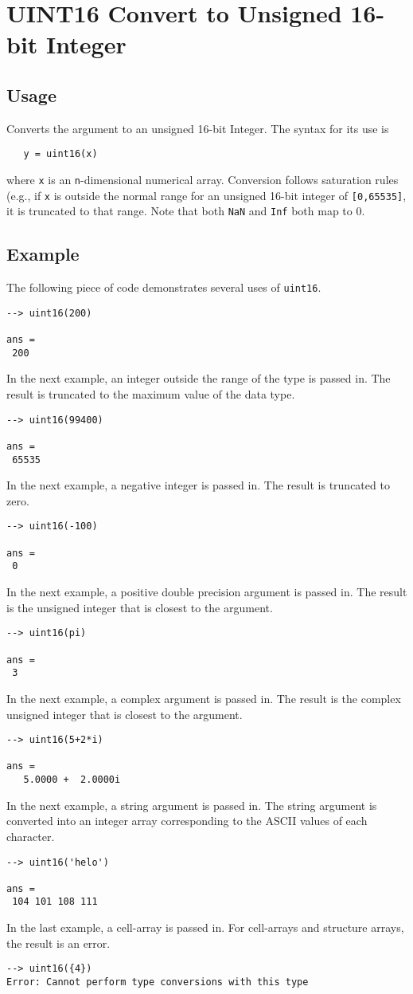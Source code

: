 \section{UINT16 Convert to Unsigned 16-bit Integer}

\subsection{Usage}

Converts the argument to an unsigned 16-bit Integer.  The syntax
for its use is
\begin{verbatim}
   y = uint16(x)
\end{verbatim}
where \verb|x| is an \verb|n|-dimensional numerical array.  Conversion
follows saturation rules (e.g., if \verb|x| is outside the normal
range for an unsigned 16-bit integer of \verb|[0,65535]|, it is truncated
to that range.  Note that
both \verb|NaN| and \verb|Inf| both map to 0.
\subsection{Example}

The following piece of code demonstrates several uses of \verb|uint16|.
\begin{verbatim}
--> uint16(200)

ans = 
 200 
\end{verbatim}
In the next example, an integer outside the range  of the type is passed in.  
The result is truncated to the maximum value of the data type.
\begin{verbatim}
--> uint16(99400)

ans = 
 65535 
\end{verbatim}
In the next example, a negative integer is passed in.  The result is 
truncated to zero.
\begin{verbatim}
--> uint16(-100)

ans = 
 0 
\end{verbatim}
In the next example, a positive double precision argument is passed in.  
The result is the unsigned integer that is closest to the argument.
\begin{verbatim}
--> uint16(pi)

ans = 
 3 
\end{verbatim}
In the next example, a complex argument is passed in.  The result is the 
complex unsigned integer that is closest to the argument.
\begin{verbatim}
--> uint16(5+2*i)

ans = 
   5.0000 +  2.0000i 
\end{verbatim}
In the next example, a string argument is passed in.  The string argument is converted into an integer array corresponding to the ASCII values of each character.
\begin{verbatim}
--> uint16('helo')

ans = 
 104 101 108 111 
\end{verbatim}
In the last example, a cell-array is passed in.  For cell-arrays and structure arrays, the result is an error.
\begin{verbatim}
--> uint16({4})
Error: Cannot perform type conversions with this type
\end{verbatim}
